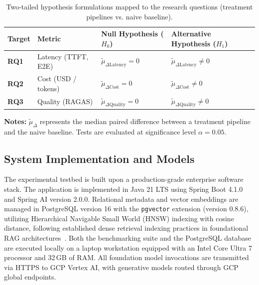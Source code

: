 \begin{table}[!htbp]
\centering
\small
\caption[Two-tailed hypothesis formulations mapped to research questions]{Two-tailed hypothesis formulations mapped to the research questions (treatment pipelines vs. naive baseline).}
\label{tab:wilcoxon_hypotheses}
\begin{tabularx}{\textwidth}{l l X X}
\toprule
\textbf{Target} & \textbf{Metric} & \textbf{Null Hypothesis ($H_0$)} & \textbf{Alternative Hypothesis ($H_1$)} \\
\midrule
\textbf{RQ1} & Latency (TTFT, E2E) & $\tilde{\mu}_{\Delta \text{Latency}} = 0$  & $\tilde{\mu}_{\Delta \text{Latency}} \neq 0$  \\
\addlinespace
\textbf{RQ2} & Cost (USD / tokens) & $\tilde{\mu}_{\Delta \text{Cost}} = 0$  & $\tilde{\mu}_{\Delta \text{Cost}} \neq 0$  \\
\addlinespace
\textbf{RQ3} & Quality (RAGAS) & $\tilde{\mu}_{\Delta \text{Quality}} = 0$ & $\tilde{\mu}_{\Delta \text{Quality}} \neq 0$ \\
\bottomrule
\end{tabularx}

\vspace{0.5em}
\parbox{\linewidth}{\footnotesize
\textbf{Notes:} $\tilde{\mu}_{\Delta}$ represents the median paired difference between a treatment pipeline and the naive baseline. Tests are evaluated at significance level $\alpha = 0.05$.}
\end{table}

\subsection{System Implementation and Models}
\label{subsec:sys_implementation}

The experimental testbed is built upon a production-grade enterprise software stack. The application is implemented in Java 21 LTS using Spring Boot 4.1.0 and Spring AI version 2.0.0. Relational metadata and vector embeddings are managed in PostgreSQL version 16 with the \texttt{pgvector} extension (version 0.8.6), utilizing Hierarchical Navigable Small World (HNSW) indexing with cosine distance, following established dense retrieval indexing practices in foundational RAG architectures~\citep{lewis2020rag}. Both the benchmarking suite and the PostgreSQL database are executed locally on a laptop workstation equipped with an Intel Core Ultra 7 processor and 32\,GB of RAM. All foundation model invocations are transmitted via HTTPS to GCP Vertex AI, with generative models routed through GCP global endpoints.

